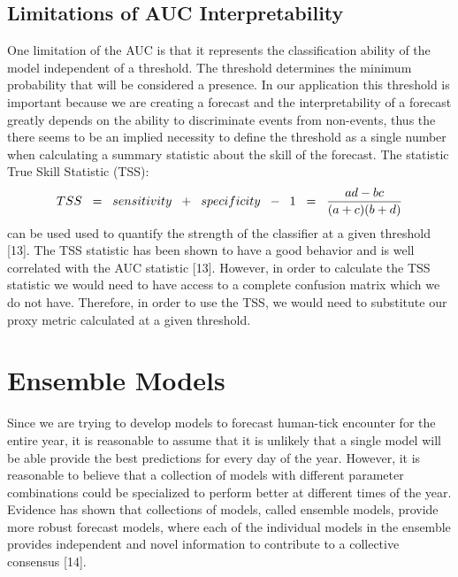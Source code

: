\subsection{Limitations of AUC Interpretability}
\noindent One limitation of the AUC is that it represents the classification ability of the model independent of a threshold. The threshold determines the minimum probability that will be considered a presence. In our application this threshold is important because we are creating a forecast and the interpretability of a forecast greatly depends on the ability to discriminate events from non-events, thus the there seems to be an implied necessity to define the threshold as a single number when calculating a summary statistic about the skill of the forecast. The statistic True Skill Statistic (TSS):
\begin{equation}
TSS \hspace{0.2cm} = \hspace{0.2cm} sensitivity \hspace{0.2cm} + \hspace{0.2cm} specificity\hspace{0.2cm}  -\hspace{0.2cm} 1 \hspace{0.2cm} =  \hspace{0.2cm} \frac{ad -bc}{(a+c)(b+d)}
\end{equation}
can be used used to quantify the strength of the classifier at a given threshold [13]. The TSS statistic has been shown to have a good behavior and is well correlated with the AUC statistic [13]. However, in order to calculate the TSS statistic we would need to have access to a complete confusion matrix which we do not have. Therefore, in order to use the TSS, we would need to substitute our proxy metric calculated at a given threshold. \newline




\section{Ensemble Models}

Since we are trying to develop models to forecast human-tick encounter for the entire year, it is reasonable to assume that it is unlikely that a single model will be able provide the best predictions for every day of the year. However, it is reasonable to believe that a collection of models with different parameter combinations could be specialized to perform better at different times of the year. Evidence has shown that collections of models, called ensemble models, provide more robust forecast models, where each of the individual models in the ensemble provides independent and novel information to contribute to a collective consensus [14]. \newline

